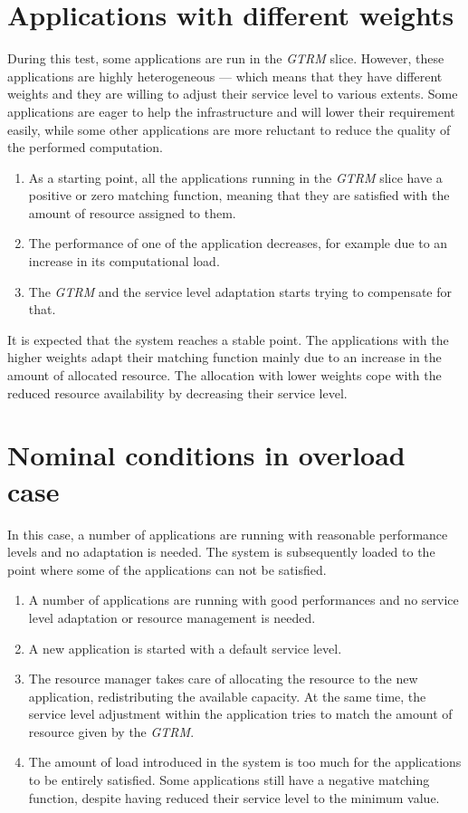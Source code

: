 \documentclass[nobiblatex]{LTHthesis}
\begin{document}
\section{Applications with different weights}

During this test, some applications are run in the \emph{GTRM} slice. However, these
applications are highly heterogeneous --- which means that they have different
weights and they are willing to adjust their service level to various extents.
Some applications are eager to help the infrastructure and will lower their
requirement easily, while some other applications are more reluctant to
reduce the quality of the performed computation.

\begin{enumerate}
\item As a starting point, all the applications running in the \emph{GTRM} slice
  have a positive or zero matching function, meaning that they are satisfied
  with the amount of resource assigned to them.
\item The performance of one of the application decreases, for example due to
  an increase in its computational load.
\item The \emph{GTRM} and the service level adaptation starts trying to compensate
  for that.
\end{enumerate}


It is expected that the system reaches a stable point. The applications with
the higher weights adapt their matching function mainly due to an increase
in the amount of allocated resource. The allocation with lower weights cope
with the reduced resource availability by decreasing their service level.

\section{Nominal conditions in overload case}

In this case, a number of applications are running with reasonable
performance levels and no adaptation is needed. The system is subsequently
loaded to the point where some of the applications can not be satisfied.

\begin{enumerate}
\item A number of applications are running with good performances and 
  no service level adaptation or resource management is needed.
\item A new application is started with a default service level.
\item The resource manager takes care of allocating the resource to the
  new application, redistributing the available capacity. At the same
  time, the service level adjustment within the application tries to match
  the amount of resource given by the \emph{GTRM}.
\item The amount of load introduced in the system is too much for the
  applications to be entirely satisfied. Some applications still have a 
  negative matching function, despite having reduced their service
  level to the minimum value.
\end{enumerate}
\end{document}
